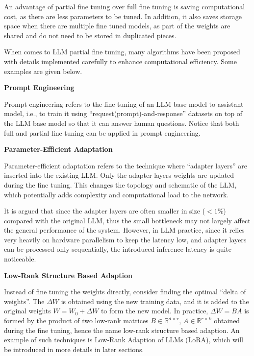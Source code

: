 An advantage of partial fine tuning over full fine tuning is saving computational cost, as there are less parameters to be tuned. In addition, it also saves storage space when there are multiple fine tuned models, as part of the weights are shared and do not need to be stored in duplicated pieces.

When comes to LLM partial fine tuning, many algorithms have been proposed with details implemented carefully to enhance computational efficiency. Some examples are given below.

\vspace{0.1in}
\noindent \textbf{Prompt Engineering} 
\vspace{0.1in}

Prompt engineering refers to the fine tuning of an LLM base model to assistant model, i.e., to train it using ``request(prompt)-and-response'' datasets on top of the LLM base model so that it can answer human questions. Notice that both full and partial fine tuning can be applied in prompt engineering.

\vspace{0.1in}
\noindent \textbf{Parameter-Efficient Adaptation} 
\vspace{0.1in}

Parameter-efficient adaptation refers to the technique where ``adapter layers'' are inserted into the existing LLM. Only the adapter layers weights are updated during the fine tuning. This changes the topology and schematic of the LLM, which potentially adds complexity and computational load to the network. 

It is argued that since the adapter layers are often smaller in size ($<1\%$) compared with the original LLM, thus the small bottleneck may not largely affect the general performance of the system. However, in LLM practice, since it relies very heavily on hardware parallelism to keep the latency low, and adapter layers can be processed only sequentially, the introduced inference latency is quite noticeable.

\vspace{0.1in}
\noindent \textbf{Low-Rank Structure Based Adaption}
\vspace{0.1in}

Instead of fine tuning the weights directly, consider finding the optimal ``delta of weights''. The $\Delta W$ is obtained using the new training data, and it is added to the original weights $W = W_0 + \Delta W$ to form the new model. In practice, $\Delta W=BA$ is formed by the product of two low-rank matrices $B\in\mathbb{R}^{d\times r}$, $A\in\mathbb{R}^{r\times k}$ obtained during the fine tuning, hence the name low-rank structure based adaption. An example of such techniques is Low-Rank Adaption of LLMs (LoRA), which will be introduced in more details in later sections.

